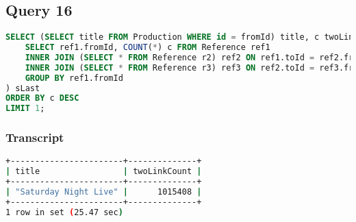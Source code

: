 \bigskip
\subsection{Query 16}
\begin{lstlisting}[language=sql]
SELECT (SELECT title FROM Production WHERE id = fromId) title, c twoLinkCount FROM (
	SELECT ref1.fromId, COUNT(*) c FROM Reference ref1
	INNER JOIN (SELECT * FROM Reference r2) ref2 ON ref1.toId = ref2.fromId
	INNER JOIN (SELECT * FROM Reference r3) ref3 ON ref2.toId = ref3.fromId
	GROUP BY ref1.fromId
) sLast
ORDER BY c DESC
LIMIT 1;
\end{lstlisting}

\subsubsection{Transcript}
\begin{lstlisting}[language=bash]
+-----------------------+--------------+
| title                 | twoLinkCount |
+-----------------------+--------------+
| "Saturday Night Live" |      1015408 |
+-----------------------+--------------+
1 row in set (25.47 sec)
\end{lstlisting}

